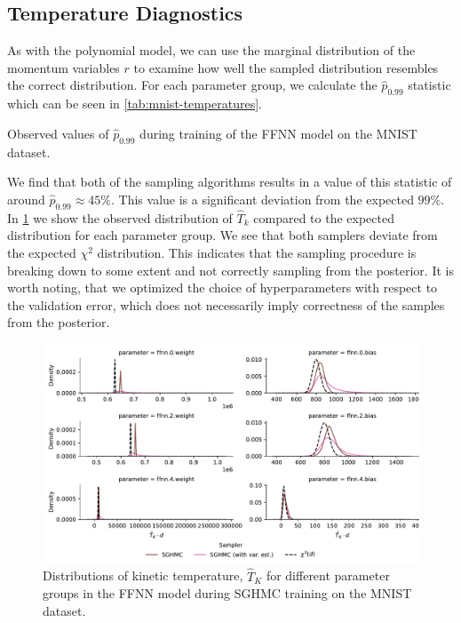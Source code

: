 \subsection{Temperature Diagnostics}
As with the polynomial model, we can use the marginal distribution of the momentum variables $r$ to examine how well the sampled distribution resembles the correct distribution.
For each parameter group, we calculate the $\hat p_{0.99}$ statistic which can be seen in \cref{tab:mnist-temperatures}.
\begin{table}[htbp]
    \centering
    
    \caption{Observed values of $\hat{p}_{0.99}$ during training of the FFNN model on the MNIST dataset.}
    \label{tab:mnist-temperatures}
\end{table}
We find that both of the sampling algorithms results in a value of this statistic of around $\hat{p}_{0.99}\approx 45\%$.
This value is a significant deviation from the expected $99\%$.
In \cref{fig:mnist-temperatures} we show the observed distribution of $\hat{T}_k$ compared to the expected distribution for each parameter group. 
We see that both samplers deviate from the expected $\chi^2$ distribution.
This indicates that the sampling procedure is breaking down to some extent and not correctly sampling from the posterior.
It is worth noting, that we optimized the choice of hyperparameters with respect to the validation error, which does not necessarily imply correctness of the samples from the posterior. 
\begin{figure}[htbp]
    \centering
    \includegraphics[width=\linewidth]{Figures/mnist-temperatures.pdf}
    \caption{Distributions of kinetic temperature, $\hat{T}_K$ for different parameter groups in the FFNN model during SGHMC training on the MNIST dataset.}
    \label{fig:mnist-temperatures}
\end{figure}

